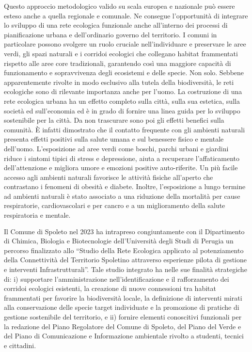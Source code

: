 \documentclass[
]{book}
\begin{document}
Questo approccio metodologico valido su scala europea e nazionale può essere esteso anche a quella regionale e comunale. Ne consegue l'opportunità di integrare lo sviluppo di una rete ecologica funzionale anche all'interno dei processi di pianificazione urbana e dell'ordinario governo del territorio. I comuni in particolare possono svolgere un ruolo cruciale nell'individuare e preservare le aree verdi, gli spazi naturali e i corridoi ecologici che collegano habitat frammentati rispetto alle aree core tradizionali, garantendo così una maggiore capacità di funzionamento e sopravvivenza degli ecosistemi e delle specie. Non solo. Sebbene apparentemente rivolte in modo esclusivo alla tutela della biodiversità, le reti ecologiche sono di rilevante importanza anche per l'uomo.
La costruzione di una rete ecologica urbana ha un effetto completo sulla città, sulla sua estetica, sulla società ed sull'economia ed è in grado di fornire una linea guida per lo sviluppo sostenibile per la città. Da non trascurare sono poi gli effetti benefici sulla comunità. È infatti dimostrato che il contatto frequente con gli ambienti naturali presenta effetti positivi sulla salute umana e sul benessere fisico e mentale dell'uomo. L'esposizione ad aree verdi come boschi, parchi urbani e giardini riduce i sintomi tipici di stress e depressione, aiuta a recuperare l'affaticamento dell'attenzione e migliora umore e emozioni positive auto-riferite. Un più facile accesso agli ambienti naturali favorisce le attività fisiche all'aperto che contrastano i fenomeni di obesità e diabete. Inoltre, l'esposizione a lungo termine ad ambienti naturali è stato associato a una riduzione della mortalità per cause respiratorie, cardiovascolari e per cancro e a un miglioramento della salute respiratoria e mentale.

Il Comune di Spoleto nel 2023 ha intrapreso congiuntamente con il Dipartimento di Chimica, Biologia e Biotecnologie dell'Università degli Studi di Perugia un percorso finalizzato allo ``Studio della Rete Ecologica applicato al potenziamento della Connettività del Territorio Spoletino attraverso esperienze pilota di gestione e interventi Infrastrutturali''. Tale studio integrato ha nelle sue finalità strategiche di: i) supportare l'amministrazione nell'identificazione e il rafforzamento dei corridoi ecologici esistenti, la creazione di nuove connessioni tra habitat frammentati per favorire la biodiversità locale, la definizione di interventi mirati alla conservazione delle specie target individuate e la promozione di pratiche di gestione sostenibile del territorio, e ii) fornire elementi conoscitivi funzionali per la redazione del Piano Regolatore del Comune di Spoleto, del Piano del Verde e del Piano di Comunicazione e Informazione ambientale rivolto a studenti, tecnici e cittadini.
\end{document}
